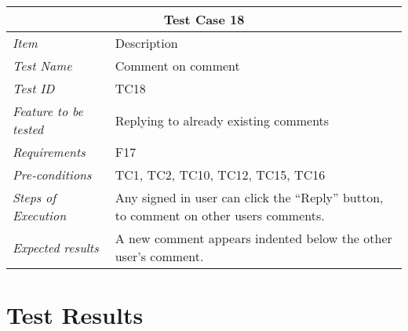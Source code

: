 %
\begin{minipage}{\linewidth}
\setlength{\tabcolsep}{15pt}
\centering
{}
\begin{tabular}{ |l|p{70mm}| }
	\hline
	\multicolumn{2}{|c|}{\cellcolor{gray!25} \textbf{Test Case 18}} \\
	\hline
	\it{\cellcolor{gray!25}Item} & {\cellcolor{gray!25} Description } \\
	\hline
	\it{\cellcolor{gray!25}Test Name } & Comment on comment \\ \hline
	\it{\cellcolor{gray!25}Test ID} & TC18 \\ \hline
	\it{\cellcolor{gray!25}Feature to be tested} & Replying to already existing comments \\ \hline
	\it{\cellcolor{gray!25}Requirements} & F17 \\ \hline
	\it{\cellcolor{gray!25}Pre-conditions} & TC1, TC2, TC10, TC12, TC15, TC16 \\ \hline
	\it{\cellcolor{gray!25}Steps of Execution} & Any signed in user can click the ``Reply'' button, to comment on other users comments.  \\ \hline
	\it{\cellcolor{gray!25}Expected results} & A new comment appears indented below the other user's comment.  \\
	\hline
\end{tabular}
\medskip
\end{minipage}








\section{Test Results}
\label{sec:TestingResults}

